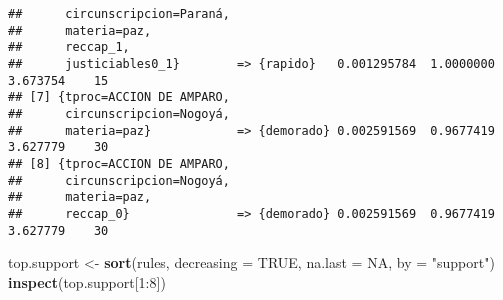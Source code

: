 \documentclass[runningheads,a4paper]{llncs}
\newenvironment{Shaded}{}{}
\newcommand{\KeywordTok}[1]{\textcolor[rgb]{0.00,0.44,0.13}{\textbf{{#1}}}}
\newcommand{\DataTypeTok}[1]{\textcolor[rgb]{0.56,0.13,0.00}{{#1}}}
\newcommand{\DecValTok}[1]{\textcolor[rgb]{0.25,0.63,0.44}{{#1}}}
\newcommand{\StringTok}[1]{\textcolor[rgb]{0.25,0.44,0.63}{{#1}}}
\newcommand{\OtherTok}[1]{\textcolor[rgb]{0.00,0.44,0.13}{{#1}}}
\newcommand{\NormalTok}[1]{{#1}}
\newcommand{\OperatorTok}[1]{\textcolor[rgb]{0.40,0.40,0.40}{{#1}}}
\begin{document}
\begin{verbatim}
##      circunscripcion=Paraná,                                                    
##      materia=paz,                                                               
##      reccap_1,                                                                  
##      justiciables0_1}        => {rapido}   0.001295784  1.0000000 3.673754    15
## [7] {tproc=ACCION DE AMPARO,                                                    
##      circunscripcion=Nogoyá,                                                    
##      materia=paz}            => {demorado} 0.002591569  0.9677419 3.627779    30
## [8] {tproc=ACCION DE AMPARO,                                                    
##      circunscripcion=Nogoyá,                                                    
##      materia=paz,                                                               
##      reccap_0}               => {demorado} 0.002591569  0.9677419 3.627779    30
\end{verbatim}

\begin{Shaded}
\begin{Highlighting}[]
\NormalTok{top.support <-}\StringTok{ }\KeywordTok{sort}\NormalTok{(rules, }\DataTypeTok{decreasing =} \OtherTok{TRUE}\NormalTok{, }
                    \DataTypeTok{na.last =} \OtherTok{NA}\NormalTok{, }\DataTypeTok{by =} \StringTok{"support"}\NormalTok{)}
\KeywordTok{inspect}\NormalTok{(top.support[}\DecValTok{1}\OperatorTok{:}\DecValTok{8}\NormalTok{])}
\end{Highlighting}
\end{Shaded}
\end{document}
